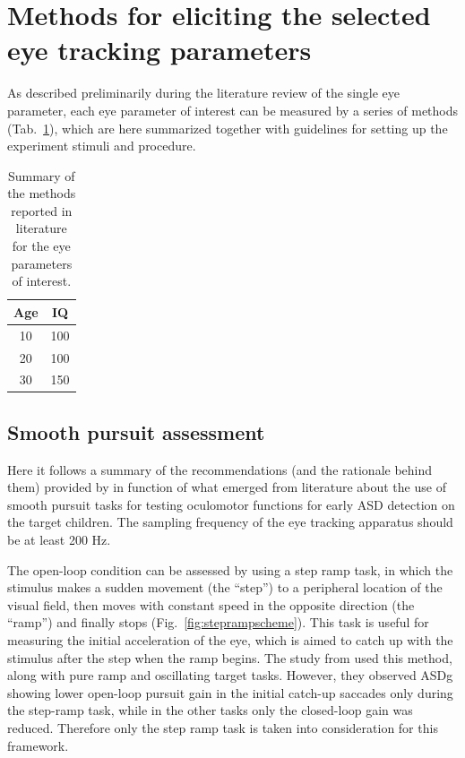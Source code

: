 \section{Methods for eliciting the selected eye tracking parameters}
\label{sec:fwkmethods}

As described preliminarily during the literature review of the single eye parameter, each eye parameter of interest can be measured by a series of methods (Tab.~\ref{tab:methodsliterature}), which are here summarized together with guidelines for setting up the experiment stimuli and procedure.

\begin{table}[h]
  \centering
  \begin{tabular}{c|c}
    Age  & IQ  \\ 
    \hline
    10   & 100 \\
    20   & 100 \\
    30   & 150
  \end{tabular}
  \caption{Summary of the methods reported in literature for the eye parameters of interest.}
  \label{tab:methodsliterature}
\end{table}



\subsection{Smooth pursuit assessment}
\label{sec:fwksmoothpursuit}

Here it follows a summary of the recommendations (and the rationale behind them) provided by \cite{smyrnis2008guidelines} in function of what emerged from literature about the use of smooth pursuit tasks for testing oculomotor functions for early ASD detection on the target children.
The sampling frequency of the eye tracking apparatus should be at least 200 Hz.

The open-loop condition can be assessed by using a step ramp task, in which the stimulus makes a sudden movement (the “step”) to a peripheral location of the visual field, then moves with constant speed in the opposite direction (the “ramp”) and finally stops (Fig.~\ref{fig:steprampscheme}). This task is useful for measuring the initial acceleration of the eye, which is aimed to catch up with the stimulus after the step when the ramp begins. The study from \cite{takarae2004smoothpursuit} used this method, along with pure ramp and oscillating target tasks. However, they observed ASDg showing lower open-loop pursuit gain in the initial catch-up saccades only during the step-ramp task, while in the other tasks only the closed-loop gain was reduced. Therefore only the step ramp task is taken into consideration for this framework.

